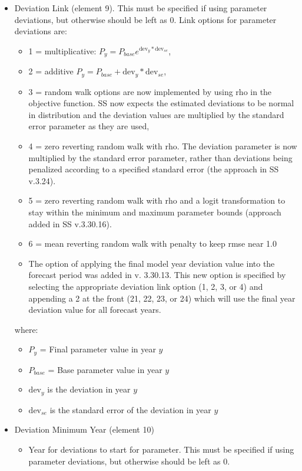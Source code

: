 \begin{itemize}
\item Deviation Link (element 9). This must be specified if using parameter deviations, but otherwise should be left as 0. Link options for parameter deviations are:
	\begin{itemize}
		\item 1 = multiplicative: $P_y = P_{base}e^{\text{dev}_y*\text{dev}_{se}}$,
		\item 2 = additive $P_y = P_{base} + \text{dev}_y*\text{dev}_{se}$,
		\item 3 = random walk options are now implemented by using rho in the objective function. SS now expects the estimated deviations to be normal in distribution and the deviation values are multiplied by the standard error parameter as they are used,
		\item 4 = zero reverting random walk with rho. The deviation parameter is now multiplied by the standard error parameter, rather than deviations being penalized according to a specified standard error (the approach in SS v.3.24).
		\item 5 = zero reverting random walk with rho and a logit transformation to stay within the minimum and maximum parameter bounds (approach added in SS v.3.30.16).
		\item 6 = mean reverting random walk with penalty to keep rmse near 1.0
		\item The option of applying the final model year deviation value into the forecast period was added in v. 3.30.13.  This new option is specified by selecting the appropriate deviation link option (1, 2, 3, or 4) and appending a 2 at the front (21, 22, 23, or 24) which will use the final year deviation value for all forecast years. 
	\end{itemize}
	where: 
	\begin{itemize}
	     \item $P_{y}$ = Final parameter value in year $y$
         \item $P_{base}$ = Base parameter value in year $y$
		 \item $\text{dev}_y$ is the deviation in year $y$
		 \item $\text{dev}_{se}$ is the standard error of the deviation in year $y$
	\end{itemize}
\item Deviation Minimum Year (element 10)
	\begin{itemize}
		\item Year for deviations to start for parameter. This must be specified if using parameter deviations, but otherwise should be left as 0.
	\end{itemize}
	

\end{itemize}

